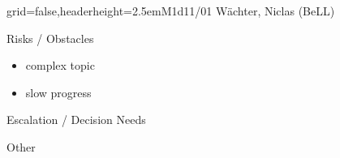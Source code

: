 \documentclass[english]{kiesgrube}
\begin{document}
\begin{poster}{grid=false,headerheight=2.5em}{}{M1d11/01 Wächter, Niclas (BeLL)}{}{}
\begin{posterbox}[name=risks,column=1,below=open]{Risks / Obstacles}
\begin{itemize}
\item complex topic 
\item slow progress
\end{itemize}
\end{posterbox}
\begin{posterbox}[name=escalation,column=1,below=risks]{Escalation / Decision Needs}
\end{posterbox}
\begin{posterbox}[name=other,column=1,below=escalation]{Other}
\end{posterbox}
\footer{}
\end{poster}

\newpage
\end{document}
